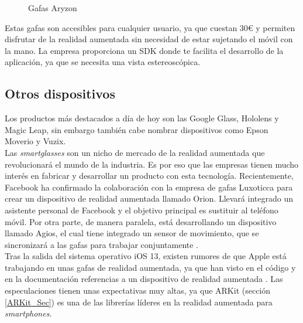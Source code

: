 \begin{figure}[H]
\centering
{}
\caption[Gafas Aryzon]{Gafas Aryzon\footnotemark}\label{GafasAryzon}
\end{figure}


Estas gafas son accesibles para cualquier usuario, ya que cuestan 30€ y permiten disfrutar de la realidad aumentada sin necesidad de estar sujetando el móvil con la mano. La empresa proporciona un SDK donde te facilita el desarrollo de la aplicación, ya que se necesita una vista estereoscópica.
\newpage
\subsection{Otros dispositivos}
Los productos más destacados a día de hoy son las Google Glass, Hololens y Magic Leap, sin embargo también cabe nombrar dispositivos como Epson Moverio y Vuzix.\\

Las \textit{smartglasses} son un nicho de mercado de la realidad aumentada que revolucionará el mundo de la industria. Es por eso que las empresas tienen mucho interés en fabricar y desarrollar un producto con esta tecnología. Recientemente, Facebook ha confirmado la colaboración con la empresa de gafas Luxoticca para crear un dispositivo de realidad aumentada llamado Orion. Llevará integrado un asistente personal de Facebook y el objetivo principal es sustituir al teléfono móvil. Por otra parte, de manera paralela, está desarrollando un dispositivo llamado Agios, el cual tiene integrado un sensor de movimiento, que se sincronizará a las gafas para trabajar conjuntamente \cite{orion}.\\
Tras la salida del sistema operativo iOS 13, existen rumores de que Apple está trabajando en unas gafas de realidad aumentada, ya que han visto en el código y en la documentación referencias a un dispositivo de realidad aumentada \cite{applerumor}. Las especulaciones tienen unas expectativas muy altas, ya que ARKit (sección \ref{ARKit_Sec}) es una de las librerías líderes en la realidad aumentada para \textit{smartphones}.
